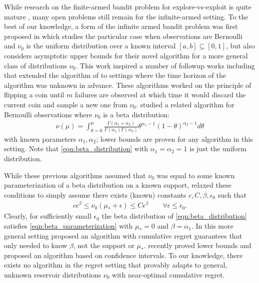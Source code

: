 While research on the finite-armed bandit problem for explore-vs-exploit is quite mature \citep{bubeck2012regret}, many open problems still remain for the infinite-armed setting.
To the best of our knowledge, a form of the infinite armed bandit problem was first proposed in \citet{berry1997} which studies the particular case when observations are Bernoulli and $\nu_0$ is the uniform distribution over a known interval $[a,b] \subseteq [0,1]$, but also considers asymptotic upper bounds for their novel algorithm for a more general class of distributions $\nu_0$. 
This work inspired a number of followup works including \cite{teytaud2007anytime} that extended the algorithm of \cite{berry1997} to settings where the time horizon of the algorithm was unknown in advance.  
These algorithms worked on the principle of flipping a coin until $m$ failures are observed at which time it would discard the current coin and sample a new one from $\nu_0$. 
\cite{bonald2013two} studied a related algorithm for Bernoulli observations where $\nu_0$ is a beta distribution:
\begin{align}\label{eqn:beta_distribution}
\nu(\mu) = \int_{\theta=0}^\mu \tfrac{\Gamma(\alpha_1+\alpha_2)}{\Gamma(\alpha_1) \Gamma(\alpha_2)} \theta^{\alpha_1-1}(1-\theta)^{\alpha_2-1} d\theta
\end{align}
with known parameters $\alpha_1,\alpha_2$; lower bounds are proven for any algorithm in this setting.
Note that \eqref{eqn:beta_distribution} with $\alpha_1=\alpha_2=1$ is just the uniform distribution.

While these previous algorithms assumed that $\nu_0$ was equal to some known parameterization of a beta distribution on a known support, \cite{wang2008} relaxed these conditions to simply assume there exists (known) constants $c,C,\beta,\epsilon_0$ such that 
\begin{align} \label{eqn:beta_parameterization}
c \epsilon^\beta \leq \nu_0(\mu_* + \epsilon) \leq C \epsilon^\beta \qquad \forall \epsilon \leq \epsilon_0.
\end{align}
Clearly, for sufficiently small $\epsilon_0$ the beta distribution of \eqref{eqn:beta_distribution} satisfies \eqref{eqn:beta_parameterization} with $\mu_*=0$ and $\beta = \alpha_1$.
In this more general setting \cite{wang2008} proposed an algorithm with cumulative regret guarantees that only needed to know $\beta$, not the support or $\mu_*$.
\citet{Chan2018Infinite} recently proved lower bounds and proposed an algorithm based on confidence intervals.
To our knowledge, there exists no algorithm in the regret setting that provably adapts to general, unknown reservoir distributions $\nu_0$ with near-optimal cumulative regret. 

